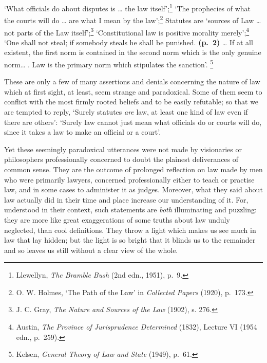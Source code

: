 \documentclass[12pt,oneside]{book}  %
\begin{document}
`What officials do about disputes is \ldots{} the law
itself';\footnote{Llewellyn, \emph{The Bramble Bush} (2nd edn., 1951),
  p.~9.} `The prophecies of what the courts will do \ldots{} are what I
mean by the law';\footnote{O. W. Holmes, `The Path of the Law' in
  \emph{Collected Papers} (1920), p.~173.} Statutes are `sources of Law
\ldots{} not parts of the Law itself';\footnote{J. C. Gray, \emph{The
  Nature and Sources of the Law} (1902), s. 276.} `Constitutional law is
positive morality merely';\footnote{Austin, \emph{The Province of
  Jurisprudence Determined} (1832), Lecture VI (1954 edn., p.~259).}
`One shall not steal; if somebody steals he shall be punished.
\textbf{(p.~2)} \ldots{} If at all existent, the first norm is contained
in the second norm which is the only genuine norm\ldots{} . Law is the
primary norm which stipulates the sanction'. \footnote{Kelsen,
  \emph{General Theory of Law and State} (1949), p.~61.}

These are only a few of many assertions and denials concerning the
nature of law which at first sight, at least, seem strange and
paradoxical. Some of them seem to conflict with the most firmly rooted
beliefs and to be easily refutable; so that we are tempted to reply,
`Surely statutes \emph{are} law, at least one kind of law even if there
are others': `Surely law cannot just mean what officials do or courts
will do, since it takes a law to make an official or a court'.

Yet these seemingly paradoxical utterances were not made by visionaries
or philosophers professionally concerned to doubt the plainest
deliverances of common sense. They are the outcome of prolonged
reflection on law made by men who were primarily lawyers, concerned
professionally either to teach or practise law, and in some cases to
administer it as judges. Moreover, what they said about law actually did
in their time and place increase our understanding of it. For,
understood in their context, such statements are \emph{both}
illuminating and puzzling: they are more like great exaggerations of
some truths about law unduly neglected, than cool definitions. They
throw a light which makes us see much in law that lay hidden; but the
light is so bright that it blinds us to the remainder and so leaves us
still without a clear view of the whole.
\end{document}
